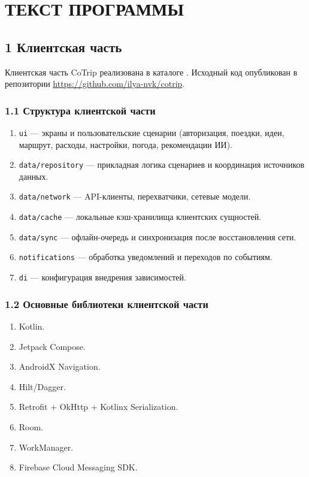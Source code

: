 \documentclass[12pt,a4paper]{article}
\begin{document}
\section*{ТЕКСТ ПРОГРАММЫ}

\subsection*{1 Клиентская часть}
Клиентская часть CoTrip реализована в каталоге .
Исходный код опубликован в репозитории \url{https://github.com/ilya-nvk/cotrip}.

\subsubsection*{1.1 Структура клиентской части}
\begin{enumerate}
  \item \texttt{ui} --- экраны и пользовательские сценарии (авторизация, поездки, идеи, маршрут, расходы, настройки, погода, рекомендации ИИ).
  \item \texttt{data/repository} --- прикладная логика сценариев и координация источников данных.
  \item \texttt{data/network} --- API-клиенты, перехватчики, сетевые модели.
  \item \texttt{data/cache} --- локальные кэш-хранилища клиентских сущностей.
  \item \texttt{data/sync} --- офлайн-очередь и синхронизация после восстановления сети.
  \item \texttt{notifications} --- обработка уведомлений и переходов по событиям.
  \item \texttt{di} --- конфигурация внедрения зависимостей.
\end{enumerate}

\subsubsection*{1.2 Основные библиотеки клиентской части}
\begin{enumerate}
  \item Kotlin.
  \item Jetpack Compose.
  \item AndroidX Navigation.
  \item Hilt/Dagger.
  \item Retrofit + OkHttp + Kotlinx Serialization.
  \item Room.
  \item WorkManager.
  \item Firebase Cloud Messaging SDK.
\end{enumerate}
\end{document}

